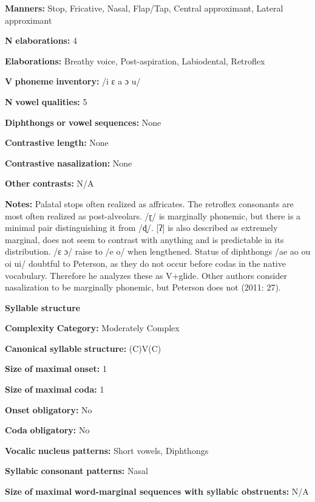 \begin{styleBody}
\textbf{Manners:} Stop, Fricative, Nasal, Flap/Tap, Central approximant, Lateral approximant

\textbf{N} \textbf{elaborations:} 4

\textbf{Elaborations:} Breathy voice, Post-aspiration, Labiodental, Retroflex

\textbf{V} \textbf{phoneme} \textbf{inventory:} /i ɛ a ɔ u/

\textbf{N} \textbf{vowel} \textbf{qualities:} 5

\textbf{Diphthongs} \textbf{or} \textbf{vowel} \textbf{sequences:} None

\textbf{Contrastive} \textbf{length:} None

\textbf{Contrastive} \textbf{nasalization:} None

\textbf{Other} \textbf{contrasts:} N/A

\textbf{Notes:} Palatal stops often realized as affricates. The retroflex consonants are most often realized as post-alveolars. /ɽ/ is marginally phonemic, but there is a minimal pair distinguishing it from /ɖ/. [ʔ] is also described as extremely marginal, does not seem to contrast with anything and is predictable in its distribution. /ɛ ɔ/ raise to /e o/ when lengthened. Status of diphthongs /ae ao ou oi ui/ doubtful to Peterson, as they do not occur before codas in the native vocabulary. Therefore he analyzes these as V+glide. Other authors consider nasalization to be marginally phonemic, but Peterson does not (2011: 27).

\textbf{Syllable} \textbf{structure}

\textbf{Complexity} \textbf{Category:} Moderately Complex

\textbf{Canonical} \textbf{syllable} \textbf{structure:} (C)V(C) \citep[32-3]{Peterson2011}

\textbf{Size} \textbf{of} \textbf{maximal} \textbf{onset:} 1

\textbf{Size} \textbf{of} \textbf{maximal} \textbf{coda:} 1

\textbf{Onset} \textbf{obligatory:} No

\textbf{Coda} \textbf{obligatory:} No

\textbf{Vocalic} \textbf{nucleus} \textbf{patterns:} Short vowels, Diphthongs

\textbf{Syllabic} \textbf{consonant} \textbf{patterns:} Nasal

\textbf{Size} \textbf{of} \textbf{maximal} \textbf{word{}-marginal sequences with syllabic obstruents:} N/A


\end{styleBody}

